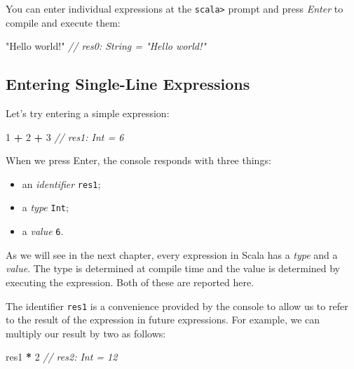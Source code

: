 \documentclass[11pt,a5paper,]{book}
\newenvironment{Shaded}{\begin{snugshade}}{\end{snugshade}}
\newcommand{\CommentTok}[1]{\textcolor[rgb]{0.56,0.35,0.01}{\textit{#1}}}
\newcommand{\DecValTok}[1]{\textcolor[rgb]{0.00,0.00,0.81}{#1}}
\newcommand{\NormalTok}[1]{#1}
\newcommand{\OperatorTok}[1]{\textcolor[rgb]{0.81,0.36,0.00}{\textbf{#1}}}
\newcommand{\StringTok}[1]{\textcolor[rgb]{0.31,0.60,0.02}{#1}}
\providecommand{\tightlist}{%
  \setlength{\itemsep}{0pt}\setlength{\parskip}{0pt}}
\begin{document}
You can enter individual expressions at the \texttt{scala\textgreater{}}
prompt and press \emph{Enter} to compile and execute them:

\begin{Shaded}
\begin{Highlighting}[]
\StringTok{"Hello world!"}
\CommentTok{// res0: String = "Hello world!"}
\end{Highlighting}
\end{Shaded}

\hypertarget{entering-single-line-expressions}{%
\subsection{Entering Single-Line
Expressions}\label{entering-single-line-expressions}}

Let's try entering a simple expression:

\begin{Shaded}
\begin{Highlighting}[]
\DecValTok{1} \OperatorTok{+} \DecValTok{2} \OperatorTok{+} \DecValTok{3}
\CommentTok{// res1: Int = 6}
\end{Highlighting}
\end{Shaded}

When we press Enter, the console responds with three things:

\begin{itemize}
\tightlist
\item
  an \emph{identifier} \texttt{res1};
\item
  a \emph{type} \texttt{Int};
\item
  a \emph{value} \texttt{6}.
\end{itemize}

As we will see in the next chapter, every expression in Scala has a
\emph{type} and a \emph{value}. The type is determined at compile time
and the value is determined by executing the expression. Both of these
are reported here.

The identifier \texttt{res1} is a convenience provided by the console to
allow us to refer to the result of the expression in future expressions.
For example, we can multiply our result by two as follows:

\begin{Shaded}
\begin{Highlighting}[]
\NormalTok{res1 }\OperatorTok{*} \DecValTok{2}
\CommentTok{// res2: Int = 12}
\end{Highlighting}
\end{Shaded}
\end{document}
